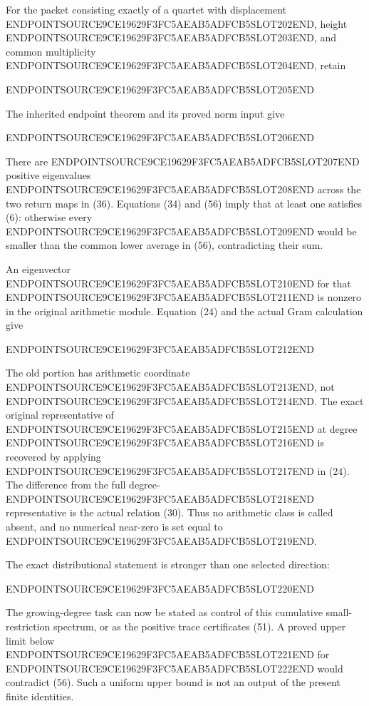 For the packet consisting exactly of a quartet with displacement ENDPOINTSOURCE9CE19629F3FC5AEAB5ADFCB5SLOT202END, height ENDPOINTSOURCE9CE19629F3FC5AEAB5ADFCB5SLOT203END, and common multiplicity ENDPOINTSOURCE9CE19629F3FC5AEAB5ADFCB5SLOT204END, retain

ENDPOINTSOURCE9CE19629F3FC5AEAB5ADFCB5SLOT205END

The inherited endpoint theorem and its proved norm input give

ENDPOINTSOURCE9CE19629F3FC5AEAB5ADFCB5SLOT206END

There are ENDPOINTSOURCE9CE19629F3FC5AEAB5ADFCB5SLOT207END positive eigenvalues ENDPOINTSOURCE9CE19629F3FC5AEAB5ADFCB5SLOT208END across the two return maps in (36). Equations (34) and (56) imply that at least one satisfies (6): otherwise every ENDPOINTSOURCE9CE19629F3FC5AEAB5ADFCB5SLOT209END would be smaller than the common lower average in (56), contradicting their sum.

An eigenvector ENDPOINTSOURCE9CE19629F3FC5AEAB5ADFCB5SLOT210END for that ENDPOINTSOURCE9CE19629F3FC5AEAB5ADFCB5SLOT211END is nonzero in the original arithmetic module. Equation (24) and the actual Gram calculation give

ENDPOINTSOURCE9CE19629F3FC5AEAB5ADFCB5SLOT212END

The old portion has arithmetic coordinate ENDPOINTSOURCE9CE19629F3FC5AEAB5ADFCB5SLOT213END, not ENDPOINTSOURCE9CE19629F3FC5AEAB5ADFCB5SLOT214END. The exact original representative of ENDPOINTSOURCE9CE19629F3FC5AEAB5ADFCB5SLOT215END at degree ENDPOINTSOURCE9CE19629F3FC5AEAB5ADFCB5SLOT216END is recovered by applying ENDPOINTSOURCE9CE19629F3FC5AEAB5ADFCB5SLOT217END in (24). The difference from the full degree-ENDPOINTSOURCE9CE19629F3FC5AEAB5ADFCB5SLOT218END representative is the actual relation (30). Thus no arithmetic class is called absent, and no numerical near-zero is set equal to ENDPOINTSOURCE9CE19629F3FC5AEAB5ADFCB5SLOT219END.

The exact distributional statement is stronger than one selected direction:

ENDPOINTSOURCE9CE19629F3FC5AEAB5ADFCB5SLOT220END

The growing-degree task can now be stated as control of this cumulative small-restriction spectrum, or as the positive trace certificates (51). A proved upper limit below ENDPOINTSOURCE9CE19629F3FC5AEAB5ADFCB5SLOT221END for ENDPOINTSOURCE9CE19629F3FC5AEAB5ADFCB5SLOT222END would contradict (56). Such a uniform upper bound is not an output of the present finite identities.

